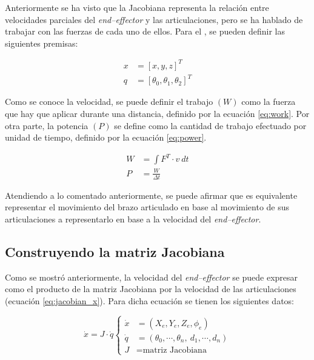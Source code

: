 Anteriormente se ha visto que la Jacobiana representa la relación entre velocidades
parciales del \textit{end--effector} y las articulaciones, pero se ha hablado de trabajar
con las fuerzas de cada uno de ellos. Para el \pArm{}, se pueden definir las siguientes
premisas:

\begin{align*}
    x & = \left[x, y, z\right]^T                      \\
    q & = \left[\theta_0, \theta_1, \theta_2\right]^T
\end{align*}

Como se conoce la velocidad, se puede definir el trabajo $\left(W\right)$ como la fuerza
que hay que aplicar durante una distancia, definido por la ecuación \ref{eq:work}. Por
otra parte, la potencia $\left(P\right)$ se define como la cantidad de trabajo efectuado
por unidad de tiempo\cite{PotenciaFisica2020}, definido por la ecuación \ref{eq:power}.

\begin{align}
    W & = \int{F^T \cdot v~dt} \label{eq:work}   \\[1ex]
    P & = \frac{W}{\varDelta t} \label{eq:power}
\end{align}

Atendiendo a lo comentado anteriormente, se puede afirmar que es equivalente
representar el movimiento del brazo articulado en base al movimiento de sus
articulaciones a representarlo en base a la velocidad del \textit{end--effector}.

\subsection*{Construyendo la matriz Jacobiana}
Como se mostró anteriormente, la velocidad del \textit{end--effector} se puede
expresar como el producto de la matriz Jacobiana por la velocidad de las articulaciones
(ecuación \ref{eq:jacobian_x}). Para dicha ecuación se tienen los siguientes datos:

\begin{equation*}
    \dot{x} = J \cdot \dot{q}
    \left\{\begin{aligned}
        \dot{x} & = \left(X_e, Y_e, Z_e, \phi_e\right)                        \\
        \dot{q} & = \left(\theta_0, \cdots, \theta_n,~d_1, \cdots, d_n\right) \\
        J       & = \text{matriz Jacobiana}
    \end{aligned}\right.
\end{equation*}

